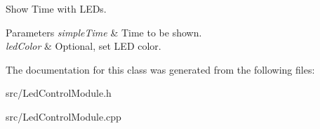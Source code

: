Show Time with L\+E\+Ds. 
\begin{DoxyParams}{Parameters}
{\em simple\+Time} & Time to be shown. \\
\hline
{\em led\+Color} & Optional, set L\+ED color. \\
\hline
\end{DoxyParams}


The documentation for this class was generated from the following files\+:\begin{DoxyCompactItemize}
\item 
src/Led\+Control\+Module.\+h\item 
src/Led\+Control\+Module.\+cpp\end{DoxyCompactItemize}
